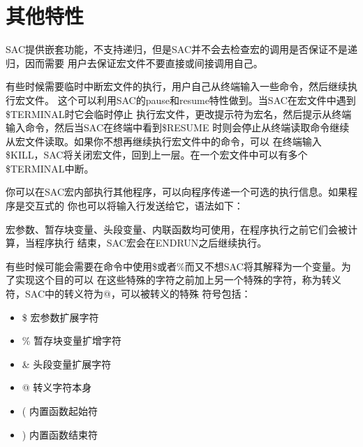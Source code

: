 \section{其他特性}
SAC提供嵌套功能，不支持递归，但是SAC并不会去检查宏的调用是否保证不是递归，因而需要
用户去保证宏文件不要直接或间接调用自己。

有些时候需要临时中断宏文件的执行，用户自己从终端输入一些命令，然后继续执行宏文件。
这个可以利用SAC的pause和resume特性做到。当SAC在宏文件中遇到\$TERMINAL时它会临时停止
执行宏文件，更改提示符为宏名，然后提示从终端输入命令，然后当SAC在终端中看到\$RESUME
时则会停止从终端读取命令继续从宏文件读取。如果你不想再继续执行宏文件中的命令，可以
在终端输入\$KILL，SAC将关闭宏文件，回到上一层。在一个宏文件中可以有多个\$TERMINAL中断。


你可以在SAC宏内部执行其他程序，可以向程序传递一个可选的执行信息。如果程序是交互式的
你也可以将输入行发送给它，语法如下：
宏参数、暂存块变量、头段变量、内联函数均可使用，在程序执行之前它们会被计算，当程序执行
结束，SAC宏会在ENDRUN之后继续执行。


有些时候可能会需要在命令中使用\$或者\%而又不想SAC将其解释为一个变量。为了实现这个目的可以
在这些特殊的字符之前加上另一个特殊的字符，称为转义符，SAC中的转义符为@，可以被转义的特殊
符号包括：
\begin{itemize}
\renewcommand\labelitemi{\dag}
\item \$  宏参数扩展字符
\item \%  暂存块变量扩增字符
\item \&  头段变量扩展字符
\item  @  转义字符本身
\item  (  内置函数起始符
\item  )  内置函数结束符
\end{itemize}
